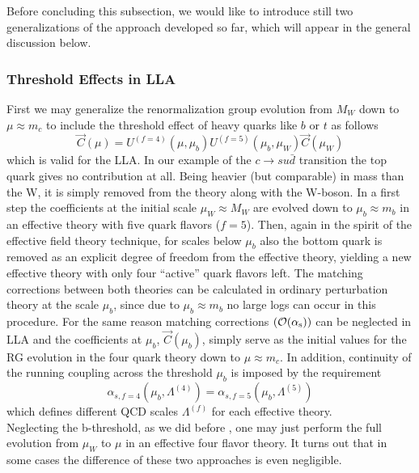 Before concluding this subsection, we would like to introduce still
two generalizations of the approach developed so far, which will
appear in the general discussion below.

\subsubsection{Threshold Effects in LLA}
               \label{sec:basicform:rg:thold}
First we may generalize the renormalization group evolution from
$M_W$ down to $\mu\approx m_c$ to include the threshold effect of
heavy quarks like $b$ or $t$ as follows
\begin{equation}\label{cmub}
\vec C(\mu)=U^{(f=4)}(\mu, \mu_b)U^{(f=5)}(\mu_b, \mu_W)\vec C(\mu_W)\end{equation}
which is valid for the LLA. In our example of the $c\to su\bar d$
transition the top quark gives no contribution at all. Being
heavier (but comparable) in mass than the W, it is simply
removed from the theory along with the W-boson. In a first step the
coefficients at the initial scale $\mu_W\approx M_W$ are evolved down to
$\mu_b\approx m_b$
in an effective theory with five quark flavors ($f=5$). Then,
again in the spirit of the effective field theory technique, for
scales below $\mu_b$ also the bottom quark is removed as an explicit
degree of freedom from the effective theory, yielding a new effective
theory with only four ``active'' quark flavors left. The matching
corrections between both theories can be calculated in ordinary
perturbation theory at the scale $\mu_b$, since due to $\mu_b\approx m_b$
no large logs can occur in this procedure. For the same reason
matching corrections $({\cal O}(\alpha_{\rm s}))$ can be neglected in LLA and the
coefficients at $\mu_b$, $\vec C(\mu_b)$, simply serve as the initial
values for the RG evolution in the four quark theory down to
$\mu\approx m_c$. In addition, continuity of the running coupling
across the threshold $\mu_b$ is imposed by the requirement
\begin{equation}\label{af45}
\alpha_{s, f=4}(\mu_b, \Lambda^{(4)}) =
\alpha_{s, f=5}(\mu_b, \Lambda^{(5)})
\end{equation}
which defines different QCD scales $\Lambda^{(f)}$ for each effective
theory.\\
Neglecting the b-threshold, as we did before , one may just
perform the full evolution from $\mu_W$ to $\mu$ in an effective
four flavor theory. It turns out that in some cases the difference
of these two approaches is even negligible.\\
